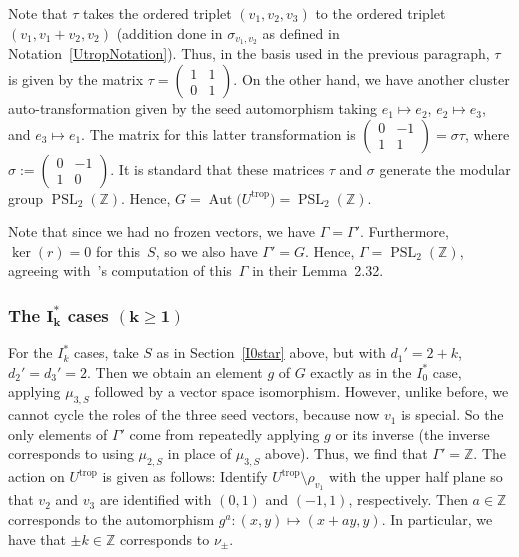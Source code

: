 \documentclass[pdftex]{sigma}
\numberwithin{equation}{section}
\numberwithin{figure}{section}
\numberwithin{table}{section}
\DeclareMathOperator{\PSL}{PSL}
\DeclareMathOperator{\trop}{trop}
\DeclareMathOperator{\Aut}{Aut}
\let\bb=\mathbb
\theoremstyle{definition}
\begin{document}
Note that $\tau$ takes the ordered triplet $(v_1,v_2,v_3)$ to the ordered triplet $(v_1,v_1+v_2, v_2)$ (addition done in $\sigma_{v_1,v_2}$ as defined in Notation~\ref{UtropNotation}). Thus, in the basis used in the previous paragraph, $\tau$ is given by the matrix $\tau=\left(\begin{smallmatrix} 1 & 1 \\ 0 & 1\end{smallmatrix}\right)$. On the other hand, we have another cluster auto-transformation given by the seed automorphism taking $e_1\mapsto e_2$, $e_2\mapsto e_3$, and $e_3\mapsto e_1$. The matrix for this latter transformation is $\left(\begin{smallmatrix} 0 & -1 \\ 1 & 1\end{smallmatrix}\right)=\sigma \tau$, where $\sigma:=\left(\begin{smallmatrix} 0 & -1 \\ 1 & 0\end{smallmatrix}\right)$. It is standard that these matrices $\tau$ and $\sigma$ generate the modular group $\PSL_2(\bb{Z})$. Hence, $G=\Aut\big(U^{\trop}\big)=\PSL_2(\bb{Z})$.
		
Note that since we had no frozen vectors, we have $\Gamma=\Gamma'$. Furthermore, $\ker(r)=0$ for this~$S$, so we also have $\Gamma'=G$. Hence, $\Gamma=\PSL_2(\bb{Z})$, agreeing with~\cite{FG1}'s computation of this~$\Gamma$ in their Lemma~2.32.

\subsubsection[The $I_k^*$ cases $(k\geq 1)$]{The $\boldsymbol{I_k^*}$ cases $\boldsymbol{(k\geq 1)}$}

For the $I_k^*$ cases, take $S$ as in Section~\ref{I0star} above, but with $d_1'=2+k$, $d_2'=d_3'=2$. Then we obtain an element $g$ of $G$ exactly as in the $I_0^*$ case, applying $\mu_{3,S}$ followed by a vector space isomorphism. However, unlike before, we cannot cycle the roles of the three seed vectors, because now $v_1$ is special. So the only elements of $\Gamma'$ come from repeatedly applying $g$ or its inverse (the inverse corresponds to using $\mu_{2,S}$ in place of $\mu_{3,S}$ above). Thus, we find that $\Gamma'=\bb{Z}$. The action on $U^{\trop}$ is given as follows: Identify $U^{\trop}\setminus \rho_{v_1}$ with the upper half plane so that $v_2$ and $v_3$ are identified with $(0,1)$ and $(-1,1)$, respectively. Then $a\in \bb{Z}$ corresponds to the automorphism $g^a\colon (x,y)\mapsto (x+ay,y)$. In particular, we have that $\pm k\in \bb{Z}$ corresponds to $\nu_{\pm}$.
\end{document}
